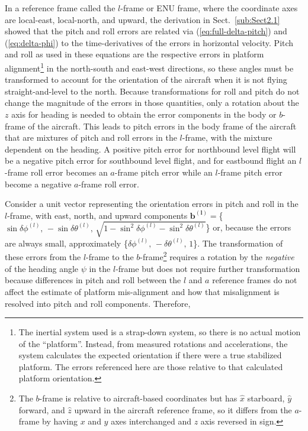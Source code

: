 \documentclass[english,british,amt,bookmarks=false,unicode=true]{copernicus}\usepackage[]{graphicx}\usepackage[]{color}
\begin{document}
In a reference frame called the $l$-frame or ENU frame, where the
coordinate axes are local-east, local-north, and upward, the derivation
in Sect.~\ref{sub:Sect2.1} showed that the pitch and roll errors
are related via (\ref{eq:full-delta-pitch}) and (\ref{eq:delta-phi})
to the time-derivatives of the errors in horizontal velocity. Pitch
and roll as used in these equations are the respective errors in platform
alignment\footnote{The inertial system used is a strap-down system, so there is no actual
motion of the ``platform''. Instead, from measured rotations and
accelerations, the system calculates the expected orientation if there
were a true stabilized platform. The errors referenced here are those
relative to that calculated platform orientation.} in the north-south and east-west directions, so these angles must
be transformed to account for the orientation of the aircraft when
it is not flying straight-and-level to the north. Because transformations
for roll and pitch do not change the magnitude of the errors in those
quantities, only a rotation about the $z$ axis for heading is needed
to obtain the error components in the body or $b$-frame of the aircraft.
This leads to pitch errors in the body frame of the aircraft that
are mixtures of pitch and roll errors in the $l$-frame, with the
mixture dependent on the heading. A positive pitch error for northbound
level flight will be a negative pitch error for southbound level flight,
and for eastbound flight an $l$-frame roll error becomes an $a$-frame
pitch error while an $l$-frame pitch error become a negative $a$-frame
roll error. 

Consider a unit vector representing the orientation errors in pitch
and roll in the $l$-frame, with east, north, and upward components
$\mathbf{b^{(l)}=}$\{$\sin\delta\phi^{(l)},\,-\sin\delta\theta^{(l)},\,\sqrt{1-\sin^{2}\delta\phi^{(l)}-\sin^{2}\delta\theta^{(l)}}$\}
or, because the errors are always small, approximately \{$\delta\phi^{(l)},\,-\delta\theta^{(l)},\,1$\}.
The transformation of these errors from the $l$-frame to the $b$-frame\footnote{The $b$-frame is relative to aircraft-based coordinates but has $\hat{x}$
starboard, $\hat{y}$ forward, and $\hat{z}$ upward in the aircraft
reference frame, so it differs from the $a$-frame by having $x$
and $y$ axes interchanged and $z$ axis reversed in sign.} requires a rotation by the \emph{negative} of the heading angle $\psi$
in the $l$-frame but does not require further transformation because
differences in pitch and roll between the $l$ and $a$ reference
frames do not affect the estimate of platform mis-alignment and how
that misalignment is resolved into pitch and roll components. Therefore, 
\end{document}

